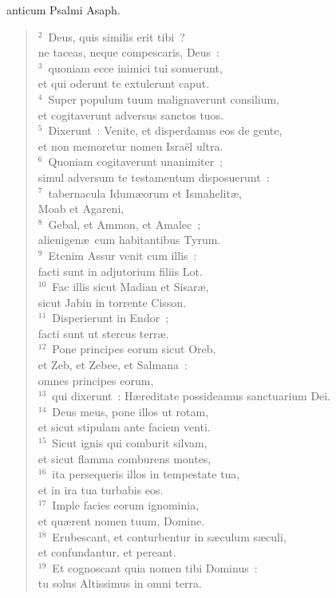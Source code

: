 \bchapter[Psalm]
anticum Psalmi Asaph.
\begin{verse}${}^{2}$~Deus, quis similis erit tibi~?\\ ne taceas, neque compescaris, Deus~:\\
${}^{3}$~quoniam ecce inimici tui sonuerunt,\\ et qui oderunt te extulerunt caput.\\
${}^{4}$~Super populum tuum malignaverunt consilium,\\ et cogitaverunt adversus sanctos tuos.\\
${}^{5}$~Dixerunt~: Venite, et disperdamus eos de gente,\\ et non memoretur nomen Isra\"el ultra.\\
${}^{6}$~Quoniam cogitaverunt unanimiter~;\\ simul adversum te testamentum disposuerunt~:\\
${}^{7}$~tabernacula Idum\ae orum et Ismahelit\ae ,\\ Moab et Agareni,\\
${}^{8}$~Gebal, et Ammon, et Amalec~;\\ alienigen\ae\ cum habitantibus Tyrum.\\
${}^{9}$~Etenim Assur venit cum illis~:\\ facti sunt in adjutorium filiis Lot.\\
${}^{10}$~Fac illis sicut Madian et Sisar\ae ,\\ sicut Jabin in torrente Cisson.\\
${}^{11}$~Disperierunt in Endor~;\\ facti sunt ut stercus terr\ae .\\
${}^{12}$~Pone principes eorum sicut Oreb,\\ et Zeb, et Zebee, et Salmana~:\\ omnes principes eorum,\\
${}^{13}$~qui dixerunt~: H\ae reditate possideamus sanctuarium Dei.\\
${}^{14}$~Deus meus, pone illos ut rotam,\\ et sicut stipulam ante faciem venti.\\
${}^{15}$~Sicut ignis qui comburit silvam,\\ et sicut flamma comburens montes,\\
${}^{16}$~ita persequeris illos in tempestate tua,\\ et in ira tua turbabis eos.\\
${}^{17}$~Imple facies eorum ignominia,\\ et qu\ae rent nomen tuum, Domine.\\
${}^{18}$~Erubescant, et conturbentur in s\ae culum s\ae culi,\\ et confundantur, et pereant.\\
${}^{19}$~Et cognoscant quia nomen tibi Dominus~:\\ tu solus Altissimus in omni terra.\end{verse}




